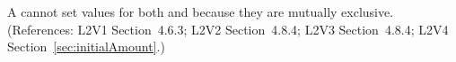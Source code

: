 A \Species cannot set values for both  and
 because they are mutually exclusive.  (References:
L2V1 Section~4.6.3; L2V2 Section~4.8.4; L2V3 Section~4.8.4; L2V4 Section~\ref{sec:initialAmount}.)
